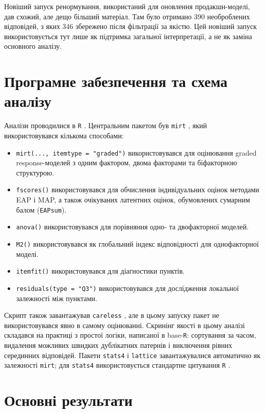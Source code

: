 \documentclass[11pt,a4paper]{article}
\begin{document}
Новіший запуск ренормування, використаний для оновлення продакшн-моделі, дав схожий, але дещо більший матеріал. Там було отримано 390 необроблених відповідей, з яких 346 збережено після фільтрації за якістю. Цей новіший запуск використовується тут лише як підтримка загальної інтерпретації, а не як заміна основного аналізу.

\section{Програмне забезпечення та схема аналізу}
Аналізи проводилися в \texttt{R} \parencite{RCore2026}. Центральним пакетом був \texttt{mirt} \parencite{Chalmers2012mirt}, який використовувався кількома способами:

\begin{itemize}
\item \texttt{mirt(..., itemtype = "graded")} використовувався для оцінювання graded response-моделей з одним фактором, двома факторами та біфакторною структурою.
\item \texttt{fscores()} використовувався для обчислення індивідуальних оцінок методами EAP і MAP, а також очікуваних латентних оцінок, обумовлених сумарним балом (\texttt{EAPsum}).
\item \texttt{anova()} використовувався для порівняння одно- та двофакторної моделей.
\item \texttt{M2()} використовувався як глобальний індекс відповідності для однофакторної моделі.
\item \texttt{itemfit()} використовувався для діагностики пунктів.
\item \texttt{residuals(type = "Q3")} використовувався для дослідження локальної залежності між пунктами.
\end{itemize}

Скрипт також завантажував \texttt{careless} \parencite{YentesWilhelm2023careless}, але в цьому запуску пакет не використовувався явно в самому оцінюванні. Скринінг якості в цьому аналізі складався на практиці з простої логіки, написаної в base-\texttt{R}: сортування за часом, видалення можливих швидких дублікатних патернів і виключення рівних серединних відповідей. Пакети \texttt{stats4} і \texttt{lattice} \parencite{Sarkar2008lattice} завантажувалися автоматично як залежності \texttt{mirt}; для \texttt{stats4} використовується стандартне цитування \texttt{R} \parencite{RCore2026}.

\section{Основні результати}
\end{document}
